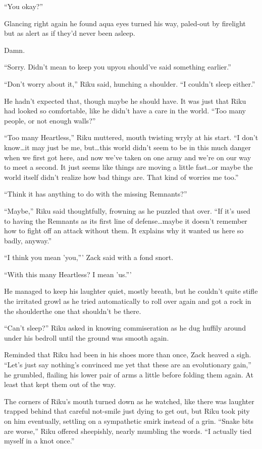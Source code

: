 ``You okay?''

Glancing right again he found aqua eyes turned his way, paled-out by firelight but as alert as if they'd never been asleep.

Damn.

``Sorry. Didn't mean to keep you up\textemdash you should've said something earlier.''

``Don't worry about it,'' Riku said, hunching a shoulder. ``I couldn't sleep either.''

He hadn't expected that, though maybe he should have. It was just that Riku had looked so comfortable, like he didn't have a care in the world. ``Too many people, or not enough walls?''

``Too many Heartless,'' Riku muttered, mouth twisting wryly at his start. ``I don't know\ldots it may just be me, but\ldots this world didn't seem to be in this much danger when we first got here, and now we've taken on one army and we're on our way to meet a second. It just seems like things are moving a little fast\ldots or maybe the world itself didn't realize how bad things are. That kind of worries me too.''

``Think it has anything to do with the missing Remnants?''

``Maybe,'' Riku said thoughtfully, frowning as he puzzled that over. ``If it's used to having the Remnants as its first line of defense\ldots maybe it doesn't remember how to fight off an attack without them. It explains why it wanted us here so badly, anyway.''

``I think you mean 'you,''' Zack said with a fond snort.

``With this many Heartless? I mean 'us.'''

He managed to keep his laughter quiet, mostly breath, but he couldn't quite stifle the irritated growl as he tried automatically to roll over again and got a rock in the shoulder\textemdash the one that shouldn't be there.

``Can't sleep?'' Riku asked in knowing commiseration as he dug huffily around under his bedroll until the ground was smooth again.

Reminded that Riku had been in his shoes more than once, Zack heaved a sigh. ``Let's just say nothing's convinced me yet that these are an evolutionary gain,'' he grumbled, flailing his lower pair of arms a little before folding them again. At least that kept them out of the way.

The corners of Riku's mouth turned down as he watched, like there was laughter trapped behind that careful not-smile just dying to get out, but Riku took pity on him eventually, settling on a sympathetic smirk instead of a grin. ``Snake bits are worse,'' Riku offered sheepishly, nearly mumbling the words. ``I actually tied myself in a knot once.''

